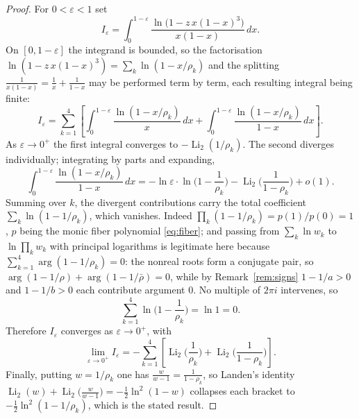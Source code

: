 \documentclass[10pt,a4paper]{amsart}
\DeclareMathOperator{\Li}{Li}
\begin{document}
\begin{proof}
For $0<\varepsilon<1$ set
\[
  I_\varepsilon=\int_0^{1-\varepsilon}\frac{\ln\!\big(1-z\,x(1-x)^3\big)}{x(1-x)}\,dx .
\]
On $[0,1-\varepsilon]$ the integrand is bounded, so the factorisation
$\ln(1-z\,x(1-x)^3)=\sum_k\ln(1-x/\rho_k)$ and the splitting
$\tfrac1{x(1-x)}=\tfrac1x+\tfrac1{1-x}$ may be performed term by term, each resulting integral being
finite:
\[
  I_\varepsilon=\sum_{k=1}^4\left[\int_0^{1-\varepsilon}\frac{\ln(1-x/\rho_k)}{x}\,dx
  +\int_0^{1-\varepsilon}\frac{\ln(1-x/\rho_k)}{1-x}\,dx\right].
\]
As $\varepsilon\to0^+$ the first integral converges to $-\Li_2(1/\rho_k)$. The second diverges
individually; integrating by parts and expanding,
\[
  \int_0^{1-\varepsilon}\frac{\ln(1-x/\rho_k)}{1-x}\,dx
  =-\ln\varepsilon\cdot\ln\!\Big(1-\frac1{\rho_k}\Big)-\Li_2\!\Big(\frac{1}{1-\rho_k}\Big)+o(1).
\]
Summing over $k$, the divergent contributions carry the total coefficient
$\sum_{k}\ln(1-1/\rho_k)$, which vanishes. Indeed $\prod_k(1-1/\rho_k)=p(1)/p(0)=1$, $p$ being the
monic fiber polynomial \eqref{eq:fiber}; and passing from $\sum_k\ln w_k$ to $\ln\prod_k w_k$ with
principal logarithms is legitimate here because $\sum_{k=1}^4\arg(1-1/\rho_k)=0$: the nonreal roots
form a conjugate pair, so $\arg(1-1/\rho)+\arg(1-1/\bar\rho)=0$, while by Remark~\ref{rem:signs}
$1-1/a>0$ and $1-1/b>0$ each contribute argument $0$. No multiple of $2\pi i$ intervenes, so
\[
  \sum_{k=1}^4\ln\Big(1-\frac1{\rho_k}\Big)=\ln 1=0 .
\]
Therefore $I_\varepsilon$ converges as $\varepsilon\to0^+$, with
\[
  \lim_{\varepsilon\to0^+}I_\varepsilon
  =-\sum_{k=1}^4\left[\Li_2\!\Big(\frac1{\rho_k}\Big)+\Li_2\!\Big(\frac{1}{1-\rho_k}\Big)\right].
\]
Finally, putting $w=1/\rho_k$ one has $\tfrac{w}{w-1}=\tfrac{1}{1-\rho_k}$, so Landen's identity
$\Li_2(w)+\Li_2\!\big(\tfrac{w}{w-1}\big)=-\tfrac12\ln^2(1-w)$ collapses each bracket to
$-\tfrac12\ln^2(1-1/\rho_k)$, which is the stated result. \qedhere
\end{proof}
\end{document}
